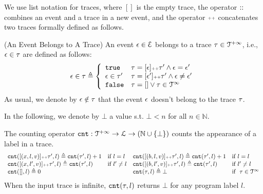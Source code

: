 We use list notation for traces, where $[]$ is the empty trace, the operator ${\small ::}$ combines an event and a trace in a new event, 
and the operator ${\scriptscriptstyle ++}$ concatenates two traces formally defined as follows. 
\begin{defn}(An Event Belongs to A Trace)
  An event $\mathtt{\epsilon} \in \mathcal{E}$ belongs to a trace $\mathtt{\tau} \in \mathcal{T}^{+\infty}$, i.e., $\mathtt{\epsilon} \in \mathtt{\tau}$ are defined as follows:
%
\begin{equation*}
  \event \in \trace  
  \triangleq \left\{
  \begin{array}{ll} 
    \etrue                  & \trace =  [\event] \tracecat \trace'
     \land \event = \event' \\
    \event \in \trace' & \trace =  [\event'] \tracecat \trace'
      \land \event \neq \event' \\ 
    \efalse                 & \trace = [] \lor \trace \in \inftdom
  \end{array}
  \right.
\end{equation*}
As usual, we denote by $\mathtt{\epsilon} \notin \mathtt{\tau}$ that the event $\mathtt{\epsilon}$ doesn't belong to the trace $\mathtt{\tau}$.
\end{defn}
%
In the following, we denote by $\bot$ a value s.t. $\bot < n $ for all $n \in \mathbb{N}$.
\begin{defn}
  \label{def:counter}
The counting operator $\mathtt{cnt} : \mathcal{T}^{+\infty} \to \mathcal{L} \to (\mathbb{N} \cup \{\bot\})$
counts the appearance of a label in a trace.
\[
\begin{array}{llll}
\mathtt{cnt}([(x, l, v)] {\scriptscriptstyle ++} \mathtt{\tau}', l ) \triangleq \mathtt{cnt}(\mathtt{\tau}', l) + 1 & \text{if}~ l = l
&
\mathtt{cnt}([(b, l, v)] {\scriptscriptstyle ++} \mathtt{\tau}', l) \triangleq \mathtt{cnt}(\mathtt{\tau}', l) + 1 & \text{if}~ l = l
\\
\mathtt{cnt}([(x, l', v)] {\scriptscriptstyle ++} \mathtt{\tau}', l) \triangleq \mathtt{cnt}(\mathtt{\tau}', l)   & \text{if}~ l' \neq l
&
\mathtt{cnt}([(b, l', v)] {\scriptscriptstyle ++} \mathtt{\tau}', l) \triangleq \mathtt{cnt}(\mathtt{\tau}', l)   & \text{if}~ l' \neq l
\\
\mathtt{cnt}({[]}, l) \triangleq 0 & 
&
\mathtt{cnt}(\mathtt{\tau}, l) \triangleq \bot & \text{if }~ \mathtt{\tau} \in \mathcal{T}^{\infty}
\end{array}
\]
{When the input trace is infinite, $\mathtt{cnt}(\mathtt{\tau}, l)$ returns $\bot$ for any program label $l$.}
\end{defn}
